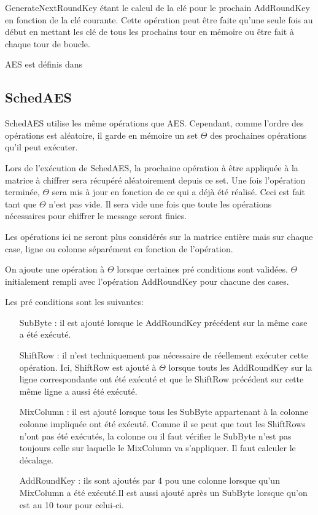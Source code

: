 \documentclass[letterpaper]{article}
\begin{document}
GenerateNextRoundKey étant le calcul de la clé pour le prochain AddRoundKey en fonction de la clé courante.
Cette opération peut être faite qu'une seule fois au début en mettant les clé de tous les prochains tour en mémoire ou être fait à chaque tour de boucle.

AES est définis dans\cite{fips197}

\subsection{SchedAES}
SchedAES utilise les même opérations que AES. Cependant, comme l'ordre des opérations est aléatoire, il garde en mémoire un set $\Theta$ des prochaines opérations qu'il peut exécuter.

Lors de l'exécution de SchedAES, la prochaine opération à être appliquée à la matrice à chiffrer sera récupéré aléatoirement depuis ce set.
Une fois l'opération terminée, $\Theta$ sera mis à jour en fonction de ce qui a déjà été réalisé.
Ceci est fait tant que $\Theta$ n'est pas vide.
Il sera vide une fois que toute les opérations nécessaires pour chiffrer le message seront finies.

Les opérations ici ne seront plus considérés sur la matrice entière mais sur chaque case, ligne ou colonne séparément en fonction de l'opération.

On ajoute une opération à $\Theta$ lorsque certaines pré conditions sont validées.
$\Theta$ initialement rempli avec l'opération AddRoundKey pour chacune des cases.

Les pré conditions sont les suivantes:
\begin{itemize}
    \item[SubByte :] il est ajouté lorsque le AddRoundKey précédent sur la même case a été exécuté.
    \item[ShiftRow :] il n'est techniquement pas nécessaire de réellement exécuter cette opération. Ici, ShiftRow est ajouté à $\Theta$ lorsque touts les AddRoundKey sur la ligne correspondante ont été exécuté et que le ShiftRow précédent sur cette même ligne a aussi été exécuté.
    \item[MixColumn :] il est ajouté lorsque tous les SubByte appartenant à la colonne colonne impliquée ont été exécuté. Comme il se peut que tout les ShiftRows n'ont pas été exécutés, la colonne ou il faut vérifier le SubByte n'est pas toujours celle sur laquelle le MixColumn va s'appliquer. Il faut calculer le décalage.
    \item[AddRoundKey :] ils sont ajoutés par 4 pou une colonne lorsque qu'un MixColumn a été exécuté.Il est aussi ajouté après un SubByte lorsque qu'on est au 10 tour pour celui-ci.
\end{itemize}
\end{document}
